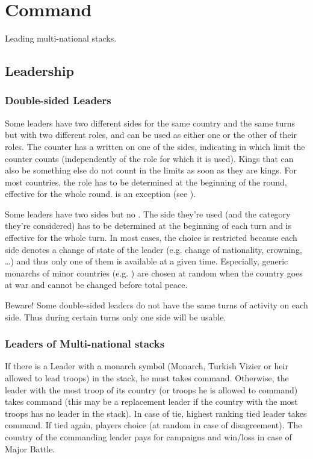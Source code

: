 \section{Command}
Leading multi-national stacks.

\subsection{Leadership}\label{chMilitary:Leadership}
\subsubsection{Double-sided Leaders}\label{chMilitary:Double Sided Leaders}
\aparag Some leaders have two different sides for the same country and the
same turns but with two different roles, and can be used as either one or the
other of their roles.
\bparag The counter has a {\textetoile} written on one of the sides,
indicating in which limit the counter counts (independently of the role
for which it is used).
\bparag Kings that can also be something else do not count in the limits
as soon as they are kings.
\bparag For most countries, the role has to be determined at the
beginning of the round, effective for the whole round. \POR is an
exception (see ).

\aparag Some leaders have two sides but no {\textetoile}.
\bparag The side they're used (and the category they're considered) has
to be determined at the beginning of each turn and is effective for the
whole turn.
\bparag In most cases, the choice is restricted because each side
denotes a change of state of the leader (e.g. change of nationality,
crowning, \ldots) and thus only one of them is available at a given
time.
\bparag Especially, generic monarchs of minor countries
(e.g. \leaderShah) are chosen at random when the country goes at war and
cannot be changed before total peace.

\aparag Beware! Some double-sided leaders do not have the same turns of
activity on each side. Thus during certain turns only one side will be
usable.

\subsubsection{Leaders of Multi-national stacks}\label{chMilitary:multi national}
\aparag[On land]
\bparag If there is a Leader with a monarch symbol (Monarch, Turkish Vizier or
heir allowed to lead troops) in the stack, he must takes command.
\bparag Otherwise, the leader with the most troop of its country (or troops he
is allowed to command) takes command (this may be a replacement leader if the
country with the most troops has no leader in the stack).
\bparag In case of tie, highest ranking tied leader takes command.
\bparag If tied again, players choice (at random in case of disagreement).
\bparag The country of the commanding leader pays for campaigns and win/loss
\STAB in case of Major Battle.

